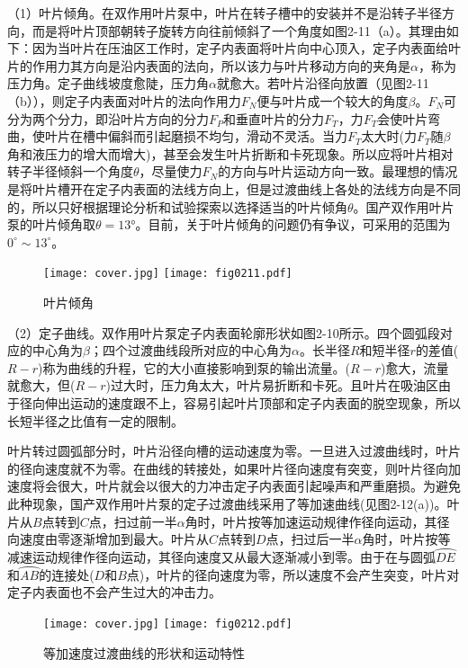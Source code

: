 （1）叶片倾角。在双作用叶片泵中，叶片在转子槽中的安装并不是沿转子半径方向，而是将叶片顶部朝转子旋转方向往前倾斜了一个角度如图2-11（a）。其理由如下：因为当叶片在压油区工作时，定子内表面将叶片向中心顶入，定子内表面给叶片的作用力其方向是沿内表面的法向，所以该力与叶片移动方向的夹角是$\alpha$，称为压力角。定子曲线坡度愈陡，压力角$\alpha$就愈大。若叶片沿径向放置（见图2-11（b）），则定子内表面对叶片的法向作用力$F_N$便与叶片成一个较大的角度$\beta$。$F_N$可分为两个分力，即沿叶片方向的分力$F_P$和垂直叶片的分力$F_T$，力$F_T$会使叶片弯曲，使叶片在槽中偏斜而引起磨损不均匀，滑动不灵活。当力$F_T$太大时(力$F_T$随$\beta$角和液压力的增大而增大)，甚至会发生叶片折断和卡死现象。所以应将叶片相对转子半径倾斜一个角度$\theta$，尽量使力$F_N$的方向与叶片运动方向一致。最理想的情况是将叶片槽开在定子内表面的法线方向上，但是过渡曲线上各处的法线方向是不同的，所以只好根据理论分析和试验探索以选择适当的叶片倾角$\theta$。国产双作用叶片泵的叶片倾角取$\theta=13°$。目前，关于叶片倾角的问题仍有争议，可采用的范围为$0^{\circ}\sim 13^{\circ}$。

\begin{figure}[htbp]
\centering
\ifOpenSource
\texttt{[image: cover.jpg]}
\else
\texttt{[image: fig0211.pdf]}
\fi
\caption{叶片倾角}
\label{fig:fig0211}
\end{figure}

\par （2）定子曲线。双作用叶片泵定子内表面轮廓形状如图2-10所示。四个圆弧段对应的中心角为$\beta$；四个过渡曲线段所对应的中心角为$\alpha$。长半径$R$和短半径$r$的差值($R-r$)称为曲线的升程，它的大小直接影响到泵的输出流量。($R-r$)愈大，流量就愈大，但($R-r$)过大时，压力角太大，叶片易折断和卡死。且叶片在吸油区由于径向伸出运动的速度跟不上，容易引起叶片顶部和定子内表面的脱空现象，所以长短半径之比值有一定的限制。
\par 叶片转过圆弧部分时，叶片沿径向槽的运动速度为零。一旦进入过渡曲线时，叶片的径向速度就不为零。在曲线的转接处，如果叶片径向速度有突变，则叶片径向加速度将会很大，叶片就会以很大的力冲击定子内表面引起噪声和严重磨损。为避免此种现象，国产双作用叶片泵的定子过渡曲线采用了等加速曲线(见图2-12(a))。叶片从$B$点转到$C$点，扫过前一半$\alpha$角时，叶片按等加速运动规律作径向运动，其径向速度由零逐渐增加到最大。叶片从$C$点转到$D$点，扫过后一半$\alpha$角时，叶片按等减速运动规律作径向运动，其径向速度又从最大逐渐减小到零。由于在与圆弧$\wideparen{DE}$和$\wideparen{AB}$的连接处($D$和$B$点)，叶片的径向速度为零，所以速度不会产生突变，叶片对定子内表面也不会产生过大的冲击力。

\begin{figure}[htbp]
\centering
\ifOpenSource
\texttt{[image: cover.jpg]}
\else
\texttt{[image: fig0212.pdf]}
\fi
\caption{等加速度过渡曲线的形状和运动特性}
\label{fig:fig0212}
\end{figure}

